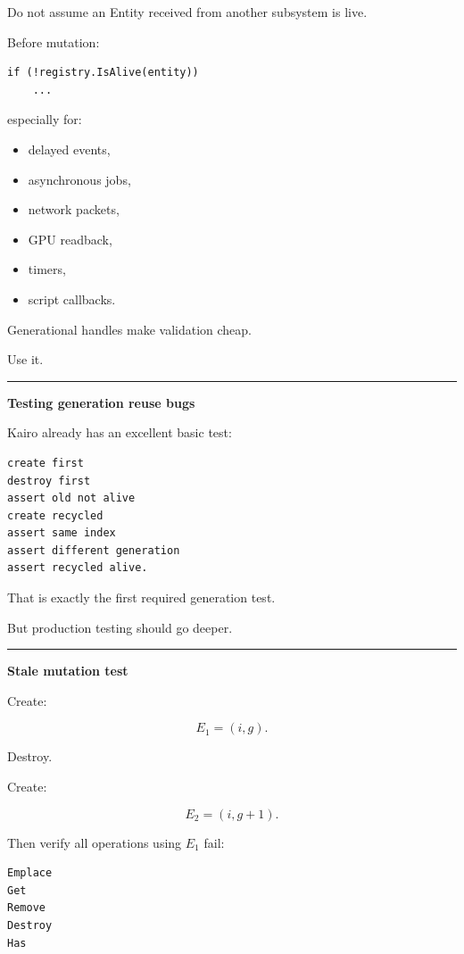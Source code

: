 Do not assume an Entity received from another subsystem is live.

Before mutation:

\begin{verbatim}
if (!registry.IsAlive(entity))
    ...
\end{verbatim}

especially for:

\begin{itemize}
\tightlist
\item
  delayed events,
\item
  asynchronous jobs,
\item
  network packets,
\item
  GPU readback,
\item
  timers,
\item
  script callbacks.
\end{itemize}

Generational handles make validation cheap.

Use it.

\begin{center}\rule{0.5\linewidth}{0.5pt}\end{center}

\textbf{Testing generation reuse bugs}

Kairo already has an excellent basic test:

\begin{verbatim}
create first
destroy first
assert old not alive
create recycled
assert same index
assert different generation
assert recycled alive.
\end{verbatim}

That is exactly the first required generation test.

But production testing should go deeper.

\begin{center}\rule{0.5\linewidth}{0.5pt}\end{center}

\textbf{Stale mutation test}

Create:

\[
E_1=(i,g).
\]

Destroy.

Create:

\[
E_2=(i,g+1).
\]

Then verify all operations using \(E_1\) fail:

\begin{verbatim}
Emplace
Get
Remove
Destroy
Has
\end{verbatim}

